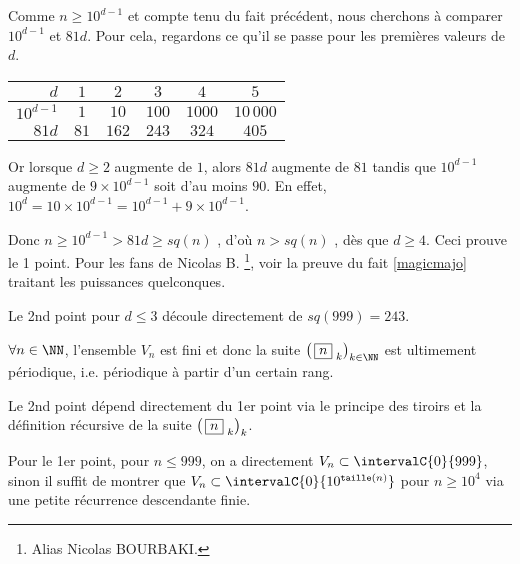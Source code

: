\begin{proof*}
	Comme $n \geqslant 10^{d-1}$ et compte tenu du fait précédent, nous cherchons à comparer $10^{d-1}$ et $81d$.
	Pour cela, regardons ce qu'il se passe pour les premières valeurs de $d$.

	\smallskip
	\begin{center}
		\begin{tabular}{|r|c|c|c|c|c|}
			\hline
				$d$        & $1$  & $2$   & $3$   & $4$    & $5$        \\
			\hline
				$10^{d-1}$ & $1$  & $10$  & $100$ & $1000$ & $10\,000$  \\
			\hline
				$81d$      & $81$ & $162$ & $243$ & $324$  & $405$      \\
			\hline
		\end{tabular}
	\end{center}
	\smallskip
	
	Or lorsque $d \geqslant 2$ augmente de $1$, alors $81d$ augmente de $81$ tandis que $10^{d-1}$ augmente de $9\times10^{d-1}$ soit d'au moins $90$.
	En effet, $10^d = 10 \times 10^{d-1} = 10^{d-1} + 9 \times 10^{d-1}$.
	
	
	\smallskip
	
	Donc $n \geqslant 10^{d-1} > 81d \geqslant sq(n)$ , d'où $n > sq(n)$ , dès que $d \geqslant 4$.
	Ceci prouve le 1\ier{} point.
	Pour les fans de Nicolas B.
	\footnote{
		Alias Nicolas BOURBAKI.
	}, 
	voir la preuve  du fait \ref{magicmajo} traitant les puissances quelconques.


	\bigskip
	
	Le 2nd point pour $d \leqslant 3$ découle directement de $sq(999) = 243$.
\end{proof*}




\medskip

\begin{fact}
	$\forall n \in \NN$, l'ensemble $V_n$ est fini et donc la suite $\left( \, \sqseq{n}{k} \right)_{k \in \NN}$ est ultimement périodique, i.e. périodique à partir d'un certain rang.
\end{fact}

\begin{proof*}
	Le 2nd point dépend directement du 1er point via le principe des tiroirs et la définition récursive de la suite $\left( \, \fbox{$n$}_{\,\,k} \right)_k$.
	
	\medskip
	
	Pour le 1er point, pour $n \leqslant 999$, on a directement $V_n \subset \intervalC{0}{999}$,
	sinon il suffit de montrer que $V_n \subset \intervalC{0}{10^{\taille(n)}}$ pour $n \geqslant 10^4$ via une petite récurrence descendante finie.
\end{proof*}